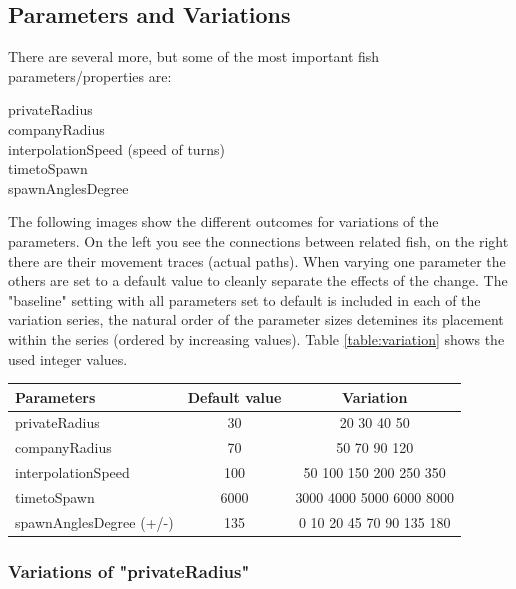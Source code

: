 \documentclass{scrartcl}
\begin{document}
\subsection{Parameters and Variations} %
There are several more, but some of the most important fish parameters/properties are:
\begin{description}
\item[privateRadius]
\item[companyRadius]
\item[interpolationSpeed (speed of turns)]
\item[timetoSpawn]
\item[spawnAnglesDegree]
\end{description}

The following images show the different outcomes for variations of the parameters. On the left you see the connections between related fish, on the right there are their movement traces (actual paths). When varying one parameter the others are set to a default value to cleanly separate the effects of the change.
The "baseline" setting with all parameters set to default is included in each of the variation series, the natural order of the parameter sizes detemines its placement within the series (ordered by increasing values). Table \ref{table:variation} shows the used integer values.

\begin{center}
\begin{tabular}{ l | c | c }
  \hline                       
  Parameters 		 & Default value 	& Variation \\
  \hline
  privateRadius 	 & 30 		& 20 30 40 50 \\
  companyRadius 	 & 70 		& 50 70 90 120 \\
  interpolationSpeed & 100 		& 50 100 150 200 250 350 \\
  timetoSpawn 		 & 6000 	& 3000 4000 5000 6000 8000 \\
  spawnAnglesDegree (+/-)  & 135 	& 0 10 20 45 70 90 135 180 \\
  \hline  
\end{tabular}
\label{table:variation}
\end{center}


\subsubsection{Variations of "privateRadius"}
\end{document}
